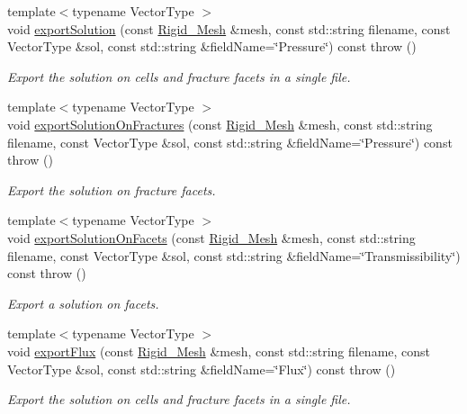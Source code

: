 \begin{DoxyCompactItemize}
{\footnotesize template$<$typename Vector\+Type $>$ }\\void \hyperlink{classFVCode3D_1_1ExporterVTU_a476a1dd02bcba8c31f0d99c7106d0c21}{export\+Solution} (const \hyperlink{classFVCode3D_1_1Rigid__Mesh}{Rigid\+\_\+\+Mesh} \&mesh, const std\+::string filename, const Vector\+Type \&sol, const std\+::string \&field\+Name=\char`\"{}Pressure\char`\"{}) const   throw ()
\begin{DoxyCompactList}\small\item\em Export the solution on cells and fracture facets in a single file. \end{DoxyCompactList}\item 
{\footnotesize template$<$typename Vector\+Type $>$ }\\void \hyperlink{classFVCode3D_1_1ExporterVTU_a2ebc29ace371341054f8780eba24d644}{export\+Solution\+On\+Fractures} (const \hyperlink{classFVCode3D_1_1Rigid__Mesh}{Rigid\+\_\+\+Mesh} \&mesh, const std\+::string filename, const Vector\+Type \&sol, const std\+::string \&field\+Name=\char`\"{}Pressure\char`\"{}) const   throw ()
\begin{DoxyCompactList}\small\item\em Export the solution on fracture facets. \end{DoxyCompactList}\item 
{\footnotesize template$<$typename Vector\+Type $>$ }\\void \hyperlink{classFVCode3D_1_1ExporterVTU_a3dd6650210988750d8c057f68a0f016d}{export\+Solution\+On\+Facets} (const \hyperlink{classFVCode3D_1_1Rigid__Mesh}{Rigid\+\_\+\+Mesh} \&mesh, const std\+::string filename, const Vector\+Type \&sol, const std\+::string \&field\+Name=\char`\"{}Transmissibility\char`\"{}) const   throw ()
\begin{DoxyCompactList}\small\item\em Export a solution on facets. \end{DoxyCompactList}\item 
{\footnotesize template$<$typename Vector\+Type $>$ }\\void \hyperlink{classFVCode3D_1_1ExporterVTU_a8e6ee7a5a2bede11d9671d37e78651a4}{export\+Flux} (const \hyperlink{classFVCode3D_1_1Rigid__Mesh}{Rigid\+\_\+\+Mesh} \&mesh, const std\+::string filename, const Vector\+Type \&sol, const std\+::string \&field\+Name=\char`\"{}Flux\char`\"{}) const   throw ()
\begin{DoxyCompactList}\small\item\em Export the solution on cells and fracture facets in a single file. \end{DoxyCompactList}\item 

\end{DoxyCompactItemize}
